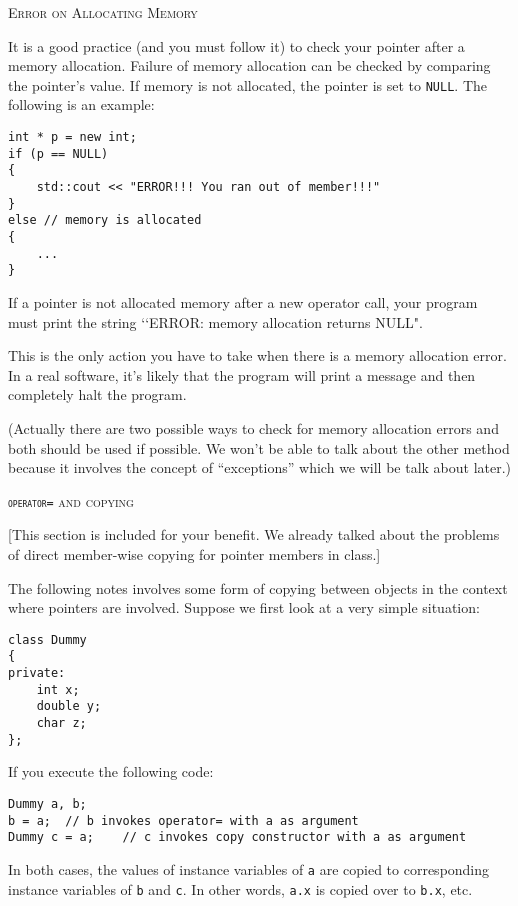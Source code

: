 \newpage
\textsc{Error on Allocating Memory}

It is a good practice (and you must follow it) to check your pointer after a 
memory allocation.  Failure of memory allocation can be checked by comparing 
the pointer's value. If memory is not allocated, the pointer is set to 
\verb!NULL!. The following is an example:

\begin{Verbatim}[frame=single]
int * p = new int;
if (p == NULL)
{
    std::cout << "ERROR!!! You ran out of member!!!"
}
else // memory is allocated
{
    ...
}
\end{Verbatim}

If a pointer is not allocated memory after a new operator call, your program 
must print the string \lq\lq ERROR: memory allocation returns NULL".

This is the only action you have to take when there is a memory allocation 
error. In a real software, it's likely that the program will print a message 
and then completely halt the program. 

(Actually there are two possible ways to check for memory allocation errors 
and both should be used if possible. We won't be able to talk about the other 
method because it involves the concept of “exceptions” which we will be talk 
about later.)


\newpage 
\textsc{\textnormal{\texttt{operator=}} and copying}

[This section is included for your benefit. We already talked about the 
problems of direct member-wise copying for pointer members in class.]

The following notes involves some form of copying between objects in the 
context where pointers are involved. Suppose we first look at a very simple 
situation:

\begin{Verbatim}[frame=single]
class Dummy
{
private:
    int x;
    double y;
    char z;
};
\end{Verbatim}

If you execute the following code:

\begin{Verbatim}[frame=single]
Dummy a, b;
b = a;  // b invokes operator= with a as argument
Dummy c = a;    // c invokes copy constructor with a as argument
\end{Verbatim}

In both cases, the values of instance variables of \verb!a! are copied to 
corresponding instance variables of \verb!b! and \verb!c!. In other words, 
\verb!a.x! is copied over to \verb!b.x!, etc.

